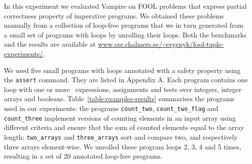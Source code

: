 

In this experiment we evaluated Vampire on FOOL problems that express partial correctness property of imperative programs. We obtained these problems manually from a collection of loop-free programs that we in turn generated from a small set of programs with loops by unrolling their loops. Both the benchmarks and the results are available at \url{www.cse.chalmers.se/~evgenyk/fool-tuple-experiments/}.


%
We used five small programs with loops annotated with a safety property using the {\tt assert} command. They are listed in Appendix A. Each program contains one loop with one or more
\ITE\ expressions, assignments and tests over integers,
integer arrays and booleans. Table~\ref{table:examples-results}
summarises the programs used in our experiments: the programs
\verb'count_two',  \verb'count_two_flag' and \verb'count_three'
implement versions of counting elements in an input array using
different criteria and ensure that the sum of counted elements equal
to the array length; \verb'two_arrays' and \verb'three_arrays' sort
and compare 
two, and respectively three arrays element-wise. 
We unrolled these program loops 2, 3, 4 and 5
times, resulting in a set of 20 annotated loop-free programs.

